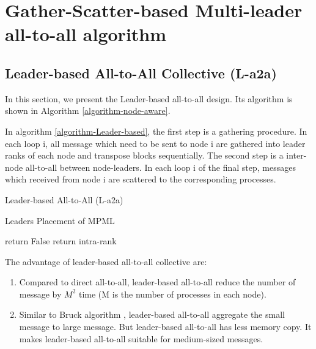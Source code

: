 \section {Gather-Scatter-based Multi-leader all-to-all algorithm}
\subsection{Leader-based All-to-All Collective (L-a2a)}
In this section, we present the Leader-based all-to-all design.
Its algorithm is shown in Algorithm \ref{algorithm-node-aware}.



In algorithm \ref{algorithm-Leader-based}, the first step is a gathering procedure.
In each loop i, all message which need to be sent to node i are gathered into leader ranks of each node and transpose blocks sequentially.
The second step is a inter-node all-to-all between node-leaders.
In each loop i of the final step, messages which received from node i are scattered to the corresponding processes. 



\begin{algorithm}
 \caption{Leader-based All-to-All (L-a2a)}\label{algorithm-Leader-based}
\SetAlgoLined
{}
\end{algorithm}
\begin{algorithm}
\caption{Leaders Placement of MPML}\label{Multi-leader-placement}
{
	return False
}
{
	return intra-rank
}
\end{algorithm}

The advantage of leader-based all-to-all collective are:
\begin{enumerate}[(1)]
\item Compared to direct all-to-all, leader-based  all-to-all reduce the number of message by $M^2$ time (M is the number of processes in each node). 
\item Similar to Bruck algorithm \cite{bruck1997efficient}, leader-based all-to-all aggregate the small message to large message. But leader-based all-to-all has less memory copy. It makes leader-based all-to-all suitable for medium-sized messages.
\end{enumerate}


